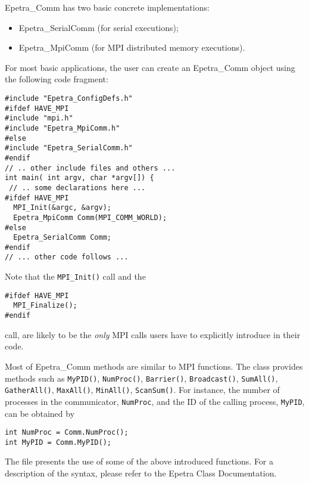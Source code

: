 Epetra\_Comm has two basic concrete implementations:
\begin{itemize}
\item Epetra\_SerialComm (for serial executions);
\item Epetra\_MpiComm (for MPI distributed memory executions).
\end{itemize}

For most basic applications, the user can create an Epetra\_Comm object
using the following code fragment:
\begin{verbatim}
#include "Epetra_ConfigDefs.h"
#ifdef HAVE_MPI
#include "mpi.h"
#include "Epetra_MpiComm.h"
#else
#include "Epetra_SerialComm.h"
#endif
// .. other include files and others ...
int main( int argv, char *argv[]) {
 // .. some declarations here ...
#ifdef HAVE_MPI
  MPI_Init(&argc, &argv);
  Epetra_MpiComm Comm(MPI_COMM_WORLD);
#else
  Epetra_SerialComm Comm;
#endif
// ... other code follows ...
\end{verbatim}
Note that the \verb!MPI_Init()! call and the
\begin{verbatim}
#ifdef HAVE_MPI
  MPI_Finalize();
#endif
\end{verbatim}
call, are likely to be the {\em only} MPI calls users have to explicitly
introduce in their code.

Most of Epetra\_Comm methods are similar to MPI functions. The class
provides methods such as \verb!MyPID()!, \verb!NumProc()!,
\verb!Barrier()!, \verb!Broadcast()!, \verb!SumAll()!,
\verb!GatherAll()!, \verb!MaxAll()!, \verb!MinAll()!, \verb!ScanSum()!.
For instance, the number of processes in the communicator,
\verb!NumProc!, and the ID of the calling process, \verb!MyPID!, can be
obtained by
\begin{verbatim}
int NumProc = Comm.NumProc();
int MyPID = Comm.MyPID();
\end{verbatim}

The file  presents the use of some of the above
introduced functions.  For a description of the syntax, please refer to
the Epetra Class Documentation.

